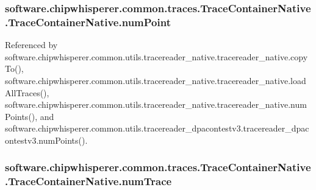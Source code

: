\hypertarget{classsoftware_1_1chipwhisperer_1_1common_1_1traces_1_1TraceContainerNative_1_1TraceContainerNative_aab836c2db50bf6827057e65952865ecd}{}
\subsubsection[{num\+Point}]{\setlength{\rightskip}{0pt plus 5cm}software.\+chipwhisperer.\+common.\+traces.\+Trace\+Container\+Native.\+Trace\+Container\+Native.\+num\+Point}\label{classsoftware_1_1chipwhisperer_1_1common_1_1traces_1_1TraceContainerNative_1_1TraceContainerNative_aab836c2db50bf6827057e65952865ecd}


Referenced by software.\+chipwhisperer.\+common.\+utils.\+tracereader\+\_\+native.\+tracereader\+\_\+native.\+copy\+To(), software.\+chipwhisperer.\+common.\+utils.\+tracereader\+\_\+native.\+tracereader\+\_\+native.\+load\+All\+Traces(), software.\+chipwhisperer.\+common.\+utils.\+tracereader\+\_\+native.\+tracereader\+\_\+native.\+num\+Points(), and software.\+chipwhisperer.\+common.\+utils.\+tracereader\+\_\+dpacontestv3.\+tracereader\+\_\+dpacontestv3.\+num\+Points().

\hypertarget{classsoftware_1_1chipwhisperer_1_1common_1_1traces_1_1TraceContainerNative_1_1TraceContainerNative_a277527b12c94b9b54e38fcb95218f428}{}
\subsubsection[{num\+Trace}]{\setlength{\rightskip}{0pt plus 5cm}software.\+chipwhisperer.\+common.\+traces.\+Trace\+Container\+Native.\+Trace\+Container\+Native.\+num\+Trace}\label{classsoftware_1_1chipwhisperer_1_1common_1_1traces_1_1TraceContainerNative_1_1TraceContainerNative_a277527b12c94b9b54e38fcb95218f428}


